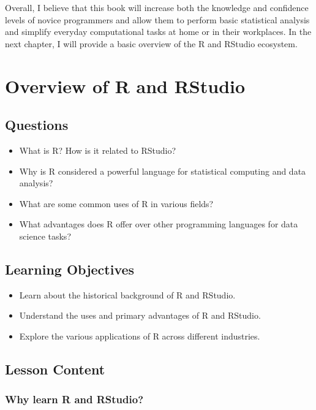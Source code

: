 \documentclass[
  letterpaper,
  DIV=11,
  numbers=noendperiod]{scrreprt}
\begin{document}
Overall, I believe that this book will increase both the knowledge and
confidence levels of novice programmers and allow them to perform basic
statistical analysis and simplify everyday computational tasks at home
or in their workplaces. In the next chapter, I will provide a basic
overview of the R and RStudio ecosystem.


\chapter{Overview of R and RStudio}\label{sec-overview}

\section{Questions}\label{questions}

\begin{itemize}
\item
  What is R? How is it related to RStudio?
\item
  Why is R considered a powerful language for statistical computing and
  data analysis?
\item
  What are some common uses of R in various fields?
\item
  What advantages does R offer over other programming languages for data
  science tasks?
\end{itemize}

\section{Learning Objectives}\label{learning-objectives}

\begin{itemize}
\item
  Learn about the historical background of R and RStudio.
\item
  Understand the uses and primary advantages of R and RStudio.
\item
  Explore the various applications of R across different industries.
\end{itemize}

\section{Lesson Content}\label{lesson-content}

\subsection{Why learn R and RStudio?}\label{why-learn-r-and-rstudio}
\end{document}
